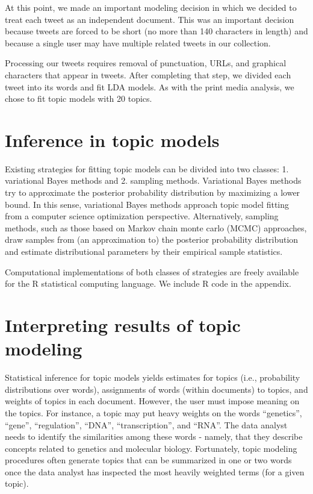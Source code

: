 \documentclass[12pt,]{article}
\begin{document}
At this point, we made an important modeling decision in which we
decided to treat each tweet as an independent document. This was an
important decision because tweets are forced to be short (no more than
140 characters in length) and because a single user may have multiple
related tweets in our collection.

Processing our tweets requires removal of punctuation, URLs, and
graphical characters that appear in tweets. After completing that step,
we divided each tweet into its words and fit LDA models. As with the
print media analysis, we chose to fit topic models with 20 topics.

\section{Inference in topic models}\label{inference-in-topic-models}

Existing strategies for fitting topic models can be divided into two
classes: 1. variational Bayes methods and 2. sampling methods.
Variational Bayes methods try to approximate the posterior probability
distribution by maximizing a lower bound. In this sense, variational
Bayes methods approach topic model fitting from a computer science
optimization perspective. Alternatively, sampling methods, such as those
based on Markov chain monte carlo (MCMC) approaches, draw samples from
(an approximation to) the posterior probability distribution and
estimate distributional parameters by their empirical sample statistics.

Computational implementations of both classes of strategies are freely
available for the R statistical computing language. We include R code in
the appendix.

\section{Interpreting results of topic
modeling}\label{interpreting-results-of-topic-modeling}

Statistical inference for topic models yields estimates for topics
(i.e., probability distributions over words), assignments of words
(within documents) to topics, and weights of topics in each document.
However, the user must impose meaning on the topics. For instance, a
topic may put heavy weights on the words ``genetics'', ``gene'',
``regulation'', ``DNA'', ``transcription'', and ``RNA''. The data
analyst needs to identify the similarities among these words - namely,
that they describe concepts related to genetics and molecular biology.
Fortunately, topic modeling procedures often generate topics that can be
summarized in one or two words once the data analyst has inspected the
most heavily weighted terms (for a given topic).
\end{document}
